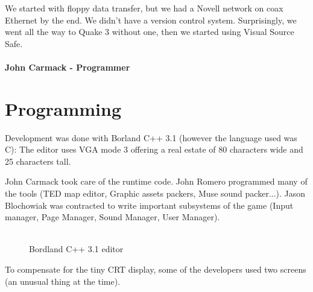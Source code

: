 \documentclass[book.tex]{subfiles}
\begin{document}
 \begin{fancyquotes}
We started with floppy data transfer, but we had a Novell network on coax Ethernet by the end. We didn't have a version control system.  Surprisingly, we went all the way to Quake 3 without one, then we started using Visual Source Safe.\\
 \\
\textbf{John Carmack - Programmer}
\end{fancyquotes}


























\section{Programming}



Development was done with Borland C++ 3.1 (however the language used was C): The editor uses VGA mode 3 offering a real estate of 80 characters wide and 25 characters tall.\\
\par
John Carmack took care of the runtime code. John Romero programmed many of the tools (TED map editor, Graphic assets packers, Muse sound packer...). Jason Blochowiak was contracted to write important subsystems of the game (Input manager, Page Manager, Sound Manager, User Manager).\\
\\
\begin{figure}[H]
\centering
\caption{Bordland C++ 3.1 editor}
\end{figure}


To compensate for the tiny CRT display, some of the developers used two screens (an unusual thing at the time).\\
\end{document}
